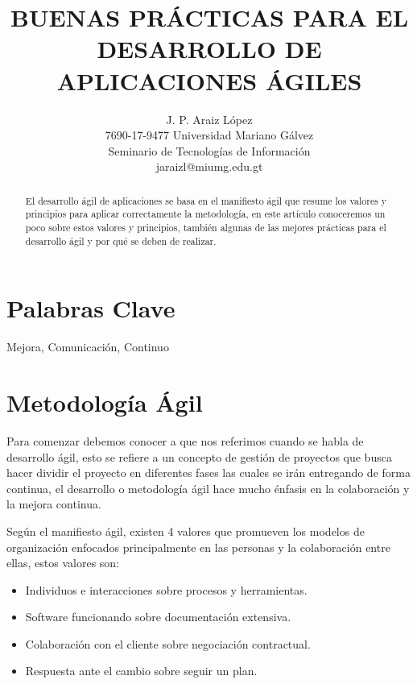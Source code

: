 \documentclass[12pt]{article}
\title{BUENAS PRÁCTICAS PARA EL DESARROLLO DE APLICACIONES ÁGILES}
\author{J. P. Araiz López\\
  \small 7690-17-9477 Universidad Mariano Gálvez\\
  \small Seminario de Tecnologías de Información\\
  \small jaraizl@miumg.edu.gt
}
\begin{document}
\maketitle

\begin{abstract}
El desarrollo ágil de aplicaciones se basa en el manifiesto ágil que resume los valores y principios para aplicar correctamente la metodología, en este artículo conoceremos un poco sobre estos valores y principios, también algunas de las mejores prácticas para el desarrollo ágil y por qué se deben de realizar.

\end{abstract}
\maketitle{}


\section*{Palabras Clave}
Mejora, Comunicación, Continuo 

\section*{Metodología Ágil}

Para comenzar debemos conocer a que nos referimos cuando se habla de desarrollo ágil, esto se refiere a un concepto de gestión de proyectos que busca hacer dividir el proyecto en diferentes fases las cuales se irán entregando de forma continua, el desarrollo o metodología ágil hace mucho énfasis en la colaboración y la mejora continua.

Según el manifiesto ágil, existen 4 valores que promueven los modelos de organización enfocados principalmente en las personas y la colaboración entre ellas, estos valores son: 
\begin{itemize}
\item Individuos e interacciones sobre procesos y herramientas.
\item Software funcionando sobre documentación extensiva.
\item Colaboración con el cliente sobre negociación contractual.
\item Respuesta ante el cambio sobre seguir un plan.
\end{itemize}
\end{document}
